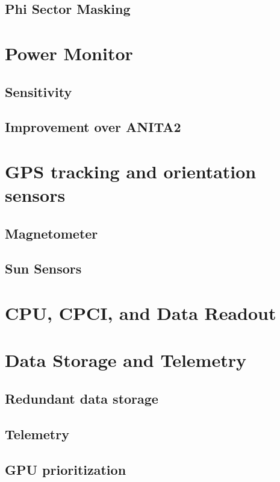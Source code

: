\documentclass[11pt]{uhthesis}
\begin{document}
	\subsection{Phi Sector Masking}
	
\section{Power Monitor}

	\subsection{Sensitivity}

	\subsection{Improvement over ANITA2}

\section{GPS tracking and orientation sensors}

	\subsection{Magnetometer}
	
	\subsection{Sun Sensors}
	
\section{CPU, CPCI, and Data Readout}
	
\section{Data Storage and Telemetry}
	
	\subsection{Redundant data storage}
	
	\subsection{Telemetry}
		
	\subsection{GPU prioritization}
			
\end{document}
